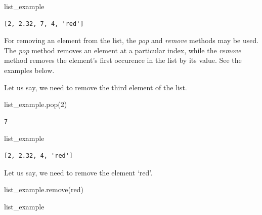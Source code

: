 \documentclass[
  letterpaper,
  DIV=11,
  numbers=noendperiod]{scrreprt}
\newenvironment{Shaded}{\begin{snugshade}}{\end{snugshade}}
\newcommand{\DecValTok}[1]{\textcolor[rgb]{0.68,0.00,0.00}{#1}}
\newcommand{\NormalTok}[1]{\textcolor[rgb]{0.00,0.23,0.31}{#1}}
\newcommand{\StringTok}[1]{\textcolor[rgb]{0.13,0.47,0.30}{#1}}
\begin{document}
\begin{Shaded}
\begin{Highlighting}[]
\NormalTok{list\_example}
\end{Highlighting}
\end{Shaded}

\begin{verbatim}
[2, 2.32, 7, 4, 'red']
\end{verbatim}

For removing an element from the list, the \emph{pop} and \emph{remove}
methods may be used. The \emph{pop} method removes an element at a
particular index, while the \emph{remove} method removes the element's
first occurence in the list by its value. See the examples below.

Let us say, we need to remove the third element of the list.

\begin{Shaded}
\begin{Highlighting}[]
\NormalTok{list\_example.pop(}\DecValTok{2}\NormalTok{)}
\end{Highlighting}
\end{Shaded}

\begin{verbatim}
7
\end{verbatim}

\begin{Shaded}
\begin{Highlighting}[]
\NormalTok{list\_example}
\end{Highlighting}
\end{Shaded}

\begin{verbatim}
[2, 2.32, 4, 'red']
\end{verbatim}

Let us say, we need to remove the element `red'.

\begin{Shaded}
\begin{Highlighting}[]
\NormalTok{list\_example.remove(}\StringTok{\textquotesingle{}red\textquotesingle{}}\NormalTok{)}
\end{Highlighting}
\end{Shaded}

\begin{Shaded}
\begin{Highlighting}[]
\NormalTok{list\_example}
\end{Highlighting}
\end{Shaded}
\end{document}
